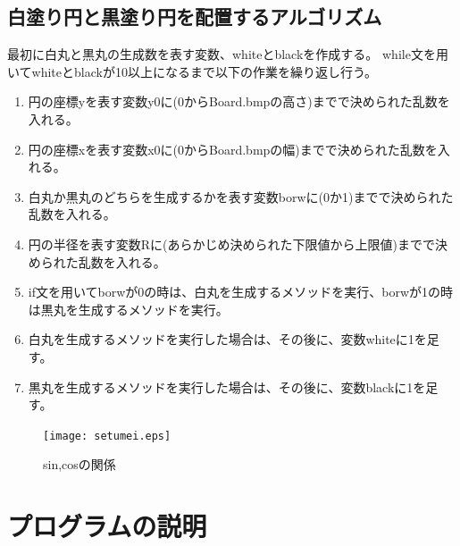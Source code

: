 \documentclass{jsarticle}
\begin{document}
\subsection{白塗り円と黒塗り円を配置するアルゴリズム}
最初に白丸と黒丸の生成数を表す変数、whiteとblackを作成する。
while文を用いてwhiteとblackが10以上になるまで以下の作業を繰り返し行う。
\begin{enumerate}
  \item 円の座標yを表す変数y0に(0からBoard.bmpの高さ)までで決められた乱数を入れる。
  \item 円の座標xを表す変数x0に(0からBoard.bmpの幅)までで決められた乱数を入れる。
  \item 白丸か黒丸のどちらを生成するかを表す変数borwに(0か1)までで決められた乱数を入れる。
  \item 円の半径を表す変数Rに(あらかじめ決められた下限値から上限値)までで決められた乱数を入れる。
  \item if文を用いてborwが0の時は、白丸を生成するメソッドを実行、borwが1の時は黒丸を生成するメソッドを実行。
  \item 白丸を生成するメソッドを実行した場合は、その後に、変数whiteに1を足す。
  \item 黒丸を生成するメソッドを実行した場合は、その後に、変数blackに1を足す。
\end{enumerate}

\begin{figure}[h]
  \begin{center}
  \texttt{[image: setumei.eps]}
  \caption{sin,cosの関係}
  \label{fig:1}
  \end{center}
\end{figure}

\section{プログラムの説明}
\end{document}
